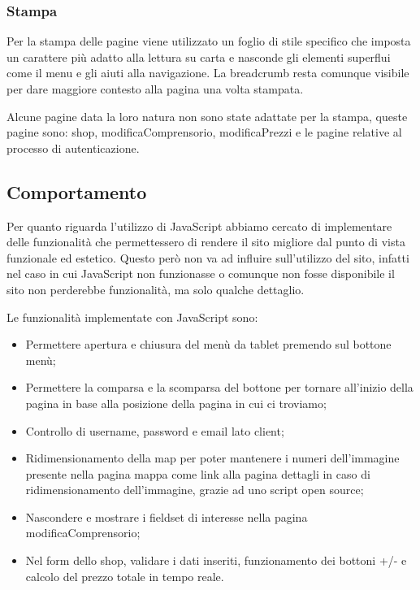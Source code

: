 \subsubsection{Stampa}
Per la stampa delle pagine viene utilizzato un foglio di stile specifico che imposta un carattere più adatto alla lettura su carta e nasconde gli elementi superflui come il menu e gli aiuti alla navigazione.
La breadcrumb resta comunque visibile per dare maggiore contesto alla pagina una volta stampata.



Alcune pagine data la loro natura non sono state adattate per la stampa, queste pagine sono: shop, modificaComprensorio, modificaPrezzi e le pagine relative al processo di autenticazione.

\newpage
\subsection{Comportamento}

Per quanto riguarda l'utilizzo di JavaScript abbiamo cercato di implementare delle funzionalità che permettessero di rendere il sito migliore dal punto di vista funzionale ed estetico.
Questo però non va ad influire sull'utilizzo del sito, infatti nel caso in cui JavaScript non funzionasse o comunque non fosse disponibile il sito non perderebbe funzionalità, ma solo qualche dettaglio.

Le funzionalità implementate con JavaScript sono:
\begin{itemize}
    \item Permettere apertura e chiusura del menù da tablet premendo sul bottone menù;
    \item Permettere la comparsa e la scomparsa del bottone per tornare all'inizio della pagina in base alla posizione della pagina in cui ci troviamo;
    \item Controllo di username, password e email lato client;
    \item Ridimensionamento della map per poter mantenere i numeri dell'immagine presente nella pagina mappa come link alla pagina dettagli in caso di ridimensionamento dell'immagine, grazie ad uno script open source;
    \item Nascondere e mostrare i fieldset di interesse nella pagina modificaComprensorio;
    \item Nel form dello shop, validare i dati inseriti, funzionamento dei bottoni +/- e calcolo del prezzo totale in tempo reale.
\end{itemize}

